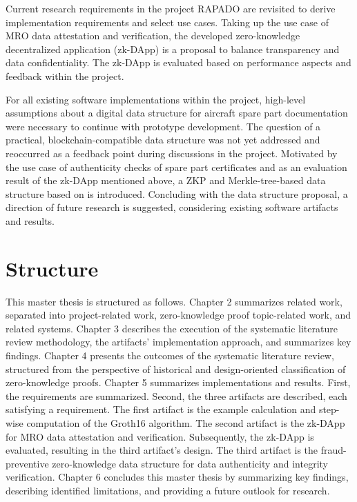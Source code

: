 Current research requirements in the project RAPADO are revisited to derive implementation requirements and select use cases. Taking up the use case of MRO data attestation and verification, the developed zero-knowledge decentralized application (zk-DApp) is a proposal to balance transparency and data confidentiality. The zk-DApp is evaluated based on performance aspects and feedback within the project.

For all existing software implementations within the project, high-level assumptions about a digital data structure for aircraft spare part documentation were necessary to continue with prototype development. The question of a practical, blockchain-compatible data structure was not yet addressed and reoccurred as a feedback point during discussions in the project. Motivated by the use case of authenticity checks of spare part certificates and as an evaluation result of the zk-DApp mentioned above, a ZKP and Merkle-tree-based data structure based on \citet{sedlemeirgrenenergy} is introduced. Concluding with the data structure proposal, a direction of future research is suggested, considering existing software artifacts and results.

\section{Structure}
This master thesis is structured as follows. Chapter 2 summarizes related work, separated into project-related work, zero-knowledge proof topic-related work, and related systems. Chapter 3 describes the execution of the systematic literature review methodology, the artifacts' implementation approach, and summarizes key findings. Chapter 4 presents the outcomes of the systematic literature review, structured from the perspective of historical and design-oriented classification of zero-knowledge proofs. Chapter 5 summarizes implementations and results. First, the requirements are summarized. Second, the three artifacts are described, each satisfying a requirement. The first artifact is the example calculation and step-wise computation of the Groth16 algorithm. The second artifact is the zk-DApp for MRO data attestation and verification. Subsequently, the zk-DApp is evaluated, resulting in the third artifact's design. The third artifact is the fraud-preventive zero-knowledge data structure for data authenticity and integrity verification. Chapter 6 concludes this master thesis by summarizing key findings, describing identified limitations, and providing a future outlook for research.

